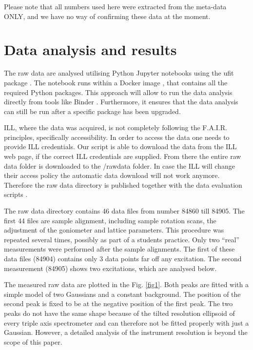 \documentclass[aps,pra,reprint,amsmath,amssymb,superscriptaddress,showkeys]{revtex4-1}
\begin{document}
Please note that all numbers used here were extracted from the meta-data ONLY, and we have no way of confirming these data at the moment. 


\section{Data analysis and results}

The raw data are analysed utilising Python Jupyter notebooks \cite{jupyter} using the ufit package \cite{ufit}.
The notebook \cite{data-evaluation} runs within a Docker image \cite{Docker}, that contains all the required Python packages.
This approach will allow to run the data analysis \cite{data-docker} directly from tools like Binder \cite{binder}.
Furthermore, it ensures that the data analysis can still be run after a specific package has been upgraded.

ILL, where the data was acquired, is not completely following the F.A.I.R. principles, specifically accessibility. 
In order to access the data one needs to provide ILL credentials. 
Our script is able to download the data from the ILL web page, if the correct ILL credentials are supplied. 
From there the entire raw data folder is downloaded to the /rawdata folder. 
In case the ILL will change their access policy the automatic data download will not work anymore. 
Therefore the raw data directory is published together with the data evaluation scripts \cite{data-evaluation}.

The raw data directory contains 46 data files from number 84860 till 84905. 
The first 44 files are sample alignment, including sample rotation scans, the adjustment of the goniometer and lattice parameters. 
This procedure was repeated several times, possibly as part of a students practice.
Only two ``real'' measurements were performed after the sample alignments.
The first of these data files (84904) contains only 3 data points far off any excitation.
The second measurement (84905) shows two excitations, which are analysed below.

The measured raw data are plotted in the Fig. \ref{fig1}.
Both peaks are fitted with a simple model of two Gaussians and a constant background. 
The position of the second peak is fixed to be at the negative position of the first peak. 
The two peaks do not have the same shape because of the tilted resolution ellipsoid of every triple axis spectrometer and can therefore not be fitted properly with just a Gaussian. 
However, a detailed analysis of the instrument resolution is beyond the scope of this paper.
\end{document}
